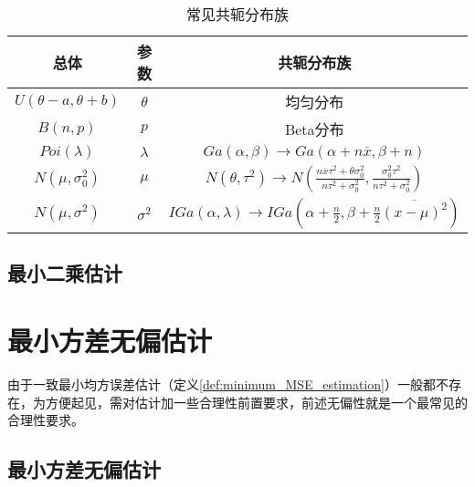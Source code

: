 \begin{table}[h]
    \renewcommand\arraystretch{1.5}
    \centering
    \begin{tabular}{@{}ccc@{}}
        \toprule
        总体                   & 参数       & 共轭分布族                                                                                                                                             \\ \midrule
        $U(\theta-a,\theta+b)$ & $\theta$   & 均匀分布                                                                                                                                               \\
        $B(n,p)$               & $p$        & Beta分布                                                                                                                                               \\
        $Poi(\lambda)$         & $\lambda$  & $Ga(\alpha,\beta)\to Ga(\alpha+n\bar{x},\beta+n)$                                                                                                      \\
        $N(\mu,\sigma_0^2)$    & $\mu$      & $N(\theta,\tau^2)\to N\left(\frac{n \overline{x} \tau^2 +\theta\sigma_0^2}{n\tau^2 +\sigma_0^2}, \frac{\sigma_0^2\tau^2}{n \tau^2 +\sigma_0^2}\right)$ \\
        $N(\mu,\sigma^2)$      & $\sigma^2$ & $IGa(\alpha,\lambda)\to IGa(\alpha+\frac{n}{2},\beta+\frac{n}{2} \overline{(x-\mu)^2})$                                                                \\
        \bottomrule
    \end{tabular}
    \caption{常见共轭分布族}
\end{table}

\subsection{最小二乘估计}

\section{最小方差无偏估计}

由于一致最小均方误差估计（定义\ref{def:minimum_MSE_estimation}）一般都不存在，为方便起见，需对估计加一些合理性前置要求，前述无偏性就是一个最常见的合理性要求。

\subsection{最小方差无偏估计}

